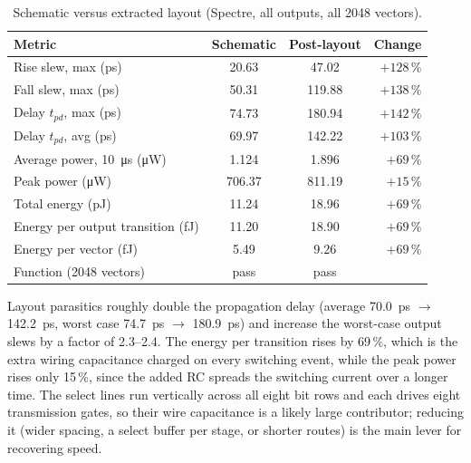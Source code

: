 \documentclass[11pt]{article}
\begin{document}
\begin{table}[H]
\centering
\caption{Schematic versus extracted layout (Spectre, all outputs, all 2048 vectors).}
\label{tab:prepost}
\begin{tabular}{l S[table-format=3.2] S[table-format=3.2] r}
\toprule
Metric & {Schematic} & {Post-layout} & Change \\
\midrule
Rise slew, max (ps)                 & 20.63  & 47.02  & $+128\,\%$ \\
Fall slew, max (ps)                 & 50.31  & 119.88 & $+138\,\%$ \\
Delay $t_{pd}$, max (ps)            & 74.73  & 180.94 & $+142\,\%$ \\
Delay $t_{pd}$, avg (ps)            & 69.97  & 142.22 & $+103\,\%$ \\
\midrule
Average power, \SI{10}{\micro s} (\si{\micro W}) & 1.124 & 1.896 & $+69\,\%$ \\
Peak power (\si{\micro W})          & 706.37 & 811.19 & $+15\,\%$ \\
Total energy (pJ)                   & 11.24  & 18.96  & $+69\,\%$ \\
Energy per output transition (fJ)   & 11.20  & 18.90  & $+69\,\%$ \\
Energy per vector (fJ)              & 5.49   & 9.26   & $+69\,\%$ \\
\midrule
Function (2048 vectors)             & {pass} & {pass} & \\
\bottomrule
\end{tabular}
\end{table}

Layout parasitics roughly double the propagation delay (average
\SI{70.0}{ps} $\rightarrow$ \SI{142.2}{ps}, worst case \SI{74.7}{ps}
$\rightarrow$ \SI{180.9}{ps}) and increase the worst-case output slews by a
factor of 2.3--2.4. The energy per transition rises by 69\,\%, which is the
extra wiring capacitance charged on every switching event, while the peak
power rises only 15\,\%, since the added RC spreads the switching current
over a longer time. The select lines run vertically across all eight bit
rows and each drives eight transmission gates, so their wire capacitance is
a likely large contributor; reducing it (wider spacing, a select buffer per
stage, or shorter routes) is the main lever for recovering speed.
\end{document}
